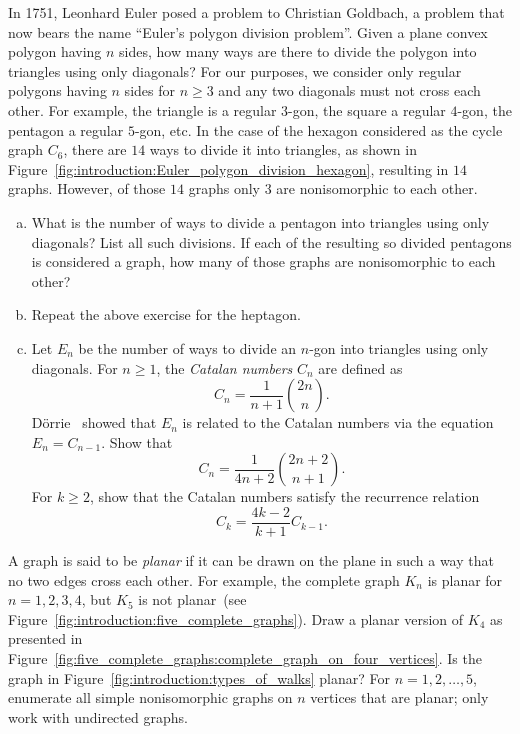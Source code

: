\begin{problem}
\item\label{prob:introduction:Euler_polygon_division}
  In 1751, Leonhard Euler posed a problem
  to Christian Goldbach, a problem that now
  bears the name ``Euler's polygon division
  problem''. Given a
  plane convex polygon having $n$ sides, how many ways are there to
  divide the polygon into triangles using only diagonals? For our
  purposes, we consider only regular polygons having $n$ sides for
  $n \geq 3$ and any two diagonals must not cross each other. For
  example, the triangle is a regular $3$-gon, the square a regular
  $4$-gon, the pentagon a regular $5$-gon, etc. In the case of the
  hexagon considered as the cycle graph $C_6$, there are $14$ ways to
  divide it into triangles, as shown in
  Figure~\ref{fig:introduction:Euler_polygon_division_hexagon},
  resulting in $14$ graphs. However, of those $14$ graphs only $3$ are
  nonisomorphic to each other.
  \begin{enumerate}[(a)]
  \item What is the number of ways to
    divide a pentagon
    into triangles using only diagonals? List all such divisions. If
    each of the resulting so divided pentagons is considered a graph,
    how many of those graphs are
    nonisomorphic to each other?

  \item Repeat the above exercise for the
    heptagon.

  \item Let $E_n$ be the number of ways to
    divide an $n$-gon
    into triangles using only diagonals. For $n \geq 1$, the
    \emph{Catalan numbers} $C_n$ are defined as
    \[
    C_n
    =
    \frac{1}{n+1} \binom{2n}{n}.
    \]
    D\"orrie~\cite[pp.21--27]{Dorrie1965}
    showed that $E_n$ is related to the Catalan
    numbers via the equation $E_n = C_{n-1}$. Show that
    \[
    C_n
    =
    \frac{1}{4n + 2} \binom{2n + 2}{n + 1}.
    \]
    For $k \geq 2$, show that the Catalan
    numbers satisfy the recurrence relation
    \[
    C_k
    =
    \frac{4k - 2}{k + 1} C_{k-1}.
    \]
  \end{enumerate}

\item A graph is said to be \emph{planar} if it
  can be drawn on the plane in such a way that no two edges cross each
  other. For example, the complete graph $K_n$ is planar for
  $n = 1, 2, 3, 4$, but $K_5$ is not planar~(see
  Figure~\ref{fig:introduction:five_complete_graphs}). Draw a planar
  version of $K_4$ as presented in
  Figure~\ref{fig:five_complete_graphs:complete_graph_on_four_vertices}. Is
  the graph in Figure~\ref{fig:introduction:types_of_walks} planar?
  For $n = 1, 2, \dots, 5$, enumerate all simple nonisomorphic graphs
  on $n$ vertices that are planar; only work with undirected graphs.


\end{problem}
